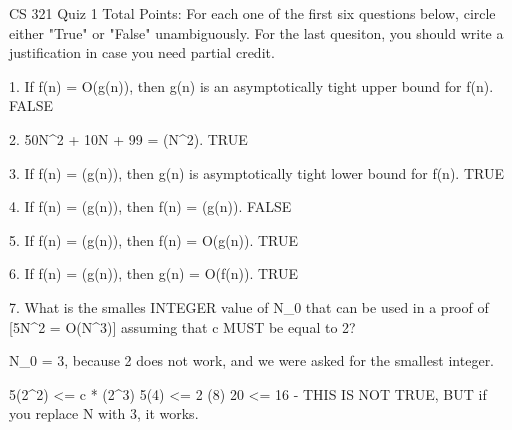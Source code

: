 CS 321
Quiz 1
Total Points:
For each one of the first six questions below, circle either "True" or "False" unambiguously. For the last quesiton, you should write a justification in case you need partial credit.

  1. If f(n) = O(g(n)), then g(n) is an asymptotically tight upper bound for f(n). FALSE

  2. 50N^2 + 10N + 99 = \Omega(N^2). TRUE

  3. If f(n) = \Theta(g(n)), then g(n) is asymptotically tight lower bound for f(n). TRUE

  4. If f(n) = \Omega(g(n)), then f(n) = \Theta(g(n)). FALSE

  5. If f(n) = \Theta(g(n)), then f(n) = O(g(n)). TRUE
  
  6. If f(n) = \Theta(g(n)), then g(n) = O(f(n)). TRUE
  
  7. What is the smalles INTEGER value of N_0 that can be used in a proof of [5N^2 = O(N^3)] assuming that c MUST be equal to 2?
  
  N_0 = 3, because 2 does not work, and we were asked for the smallest integer.
  
  5(2^2) <= c * (2^3)
  5(4) <= 2 (8)
  20 <= 16 - THIS IS NOT TRUE, BUT if you replace N with 3, it works.
